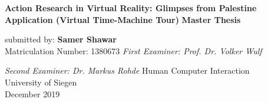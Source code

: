 \begin{titlepage}
    \begin{center}
        \vspace*{1cm}
        \Huge
        \textbf{Action Research in Virtual Reality: Glimpses from Palestine Application (Virtual Time-Machine Tour)}
        \vfill
        \LARGE
        \textbf{Master Thesis}
        
        \vspace{0.5cm}
        submitted by:
        \vspace{1.5cm}
        \textbf{Samer Shawar}\\
        Matriculation Number: 1380673
        \vfill
        \textit {First Examiner: Prof. Dr. Volker Wulf}
        
        
        \textit {Second Examiner: Dr. Markus Rohde}
        \vfill
        \Large
        Human Computer Interaction\\
        University of Siegen\\
        December 2019\\
 \end{center}
\end{titlepage}